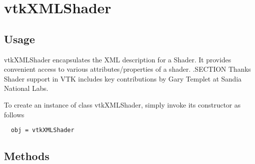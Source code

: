 \section{vtkXMLShader}

\subsection{Usage}

 vtkXMLShader encapsulates the XML description for a Shader.
 It provides convenient access to various attributes/properties
 of a shader.
 .SECTION Thanks
 Shader support in VTK includes key contributions by Gary Templet at 
 Sandia National Labs.

To create an instance of class vtkXMLShader, simply
invoke its constructor as follows
\begin{verbatim}
  obj = vtkXMLShader
\end{verbatim}
\subsection{Methods}

